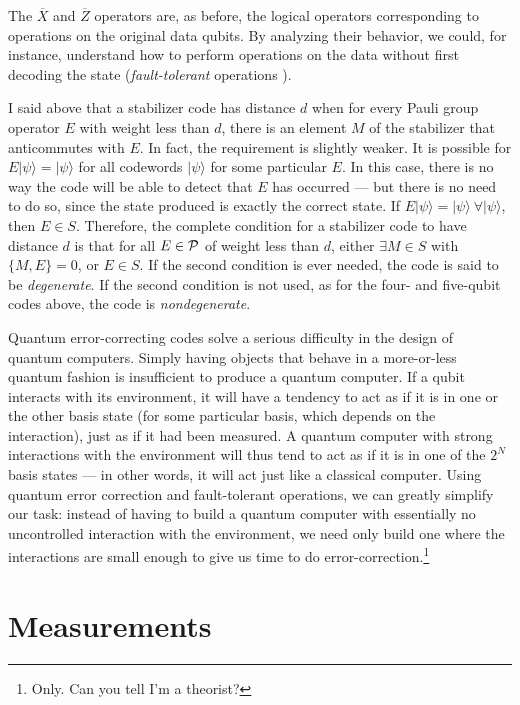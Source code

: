 The $\overline{X}$ and $\overline{Z}$ operators are, as before, the
logical operators corresponding to operations on the original data
qubits.  By analyzing their behavior, we could, for instance,
understand how to perform operations on the data without first
decoding the state ({\em fault-tolerant} operations
\cite{gottesman:FT,shor:FT}).

I said above that a stabilizer code has distance $d$ when for every
Pauli group operator $E$ with weight less than $d$, there is an
element $M$ of the stabilizer that anticommutes with $E$.  In fact,
the requirement is slightly weaker.  It is possible for $E
|\psi\rangle = |\psi\rangle$ for all codewords $|\psi\rangle$ for some
particular $E$.  In this case, there is no way the code will be able
to detect that $E$ has occurred --- but there is no need to do so,
since the state produced is exactly the correct state.  If $E
|\psi\rangle = |\psi\rangle\ \forall |\psi\rangle$, then $E \in S$.
Therefore, the complete condition for a stabilizer code to have
distance $d$ is that for all $E \in {\cal P}$ of weight less than $d$,
either $\exists M \in S$ with $\{M, E\} = 0$, or $E \in S$.  If the
second condition is ever needed, the code is said to be {\em degenerate}.
If the second condition is not used, as for the four- and five-qubit
codes above, the code is {\em nondegenerate}.

Quantum error-correcting codes solve a serious difficulty in the
design of quantum computers.  Simply having objects that behave in a
more-or-less quantum fashion is insufficient to produce a quantum
computer.  If a qubit interacts with its environment, it will have a
tendency to act as if it is in one or the other basis state (for some
particular basis, which depends on the interaction), just as if it had
been measured.  A quantum computer with strong interactions with the
environment will thus tend to act as if it is in one of the $2^N$
basis states --- in other words, it will act just like a classical
computer.  Using quantum error correction and fault-tolerant
operations, we can greatly simplify our task: instead of having to
build a quantum computer with essentially no uncontrolled interaction
with the environment, we need only build one where the interactions
are small enough to give us time to do
error-correction.\footnote{Only.  Can you tell I'm a theorist?}

\section{Measurements}

